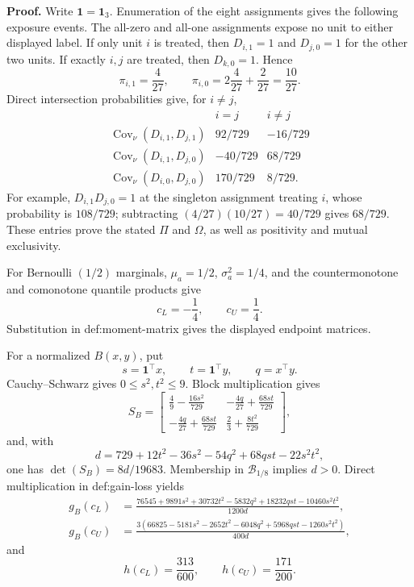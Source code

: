\textbf{Proof.}
Write \(\mathbf1=\mathbf1_3\).  Enumeration of the eight assignments gives the following exposure events.  The all-zero and all-one assignments expose no unit to either displayed label.  If only unit \(i\) is treated, then \(D_{i,1}=1\) and \(D_{j,0}=1\) for the other two units.  If exactly \(i,j\) are treated, then \(D_{k,0}=1\).  Hence
\[
 \pi_{i,1}=\frac4{27},\qquad \pi_{i,0}=2\frac4{27}+\frac2{27}=\frac{10}{27}.
\]
Direct intersection probabilities give, for \(i\ne j\),
\[
\begin{array}{c|cc}
&i=j&i\ne j\\ \hline
\operatorname{Cov}_\nu(D_{i,1},D_{j,1})&92/729&-16/729\\
\operatorname{Cov}_\nu(D_{i,1},D_{j,0})&-40/729&68/729\\
\operatorname{Cov}_\nu(D_{i,0},D_{j,0})&170/729&8/729.
\end{array}
\]
For example, \(D_{i,1}D_{j,0}=1\) at the singleton assignment treating \(i\), whose probability is \(108/729\); subtracting \((4/27)(10/27)=40/729\) gives \(68/729\).  These entries prove the stated \(\Pi\) and \(\Omega\), as well as positivity and mutual exclusivity.

For Bernoulli \((1/2)\) marginals, \(\mu_a=1/2\), \(\sigma_a^2=1/4\), and the countermonotone and comonotone quantile products give
\[
 c_L=-\frac14,\qquad c_U=\frac14.
\]
Substitution in def:moment-matrix gives the displayed endpoint matrices.

For a normalized \(B(x,y)\), put
\[
 s=\mathbf1^{\top}x,\qquad t=\mathbf1^{\top}y,\qquad q=x^{\top}y.
\]
Cauchy--Schwarz gives \(0\le s^2,t^2\le9\).  Block multiplication gives
\[
 S_B=\begin{bmatrix}
 \frac49-\frac{16s^2}{729}&-\frac{4q}{27}+\frac{68st}{729}\\
 -\frac{4q}{27}+\frac{68st}{729}&\frac23+\frac{8t^2}{729}
 \end{bmatrix},
\]
and, with
\[
 d=729+12t^2-36s^2-54q^2+68qst-22s^2t^2,
\]
one has \(\det(S_B)=8d/19683\).  Membership in \(\mathcal B_{1/8}\) implies \(d>0\).  Direct multiplication in def:gain-loss yields
\[
\begin{aligned}
g_B(c_L)&=\frac{76545+9891s^2+30732t^2-5832q^2+18232qst-10460s^2t^2}{1200d},\\
g_B(c_U)&=\frac{3(66825-5181s^2-2652t^2-6048q^2+5968qst-1260s^2t^2)}{400d},
\end{aligned} \tag{1}
\]
and
\[
 h(c_L)=\frac{313}{600},\qquad h(c_U)=\frac{171}{200}. \tag{2}
\]

